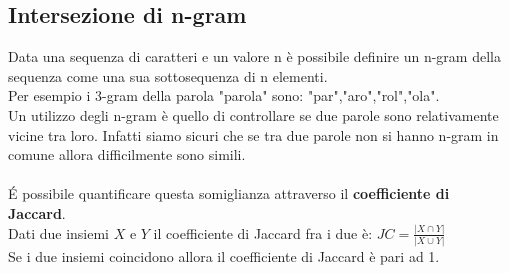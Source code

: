 \documentclass[]{article}
\begin{document}
\subsection{Intersezione di n-gram}
Data una sequenza di caratteri e un valore n è possibile definire un n-gram della sequenza come una sua sottosequenza di n elementi.\\
Per esempio i 3-gram della parola "parola" sono: "par","aro","rol","ola".\\
Un utilizzo degli n-gram è quello di controllare se due parole sono relativamente vicine tra loro. Infatti siamo sicuri che se tra due parole non si hanno n-gram in comune allora difficilmente sono simili.\\\\
\'E possibile quantificare questa somiglianza attraverso il \textbf{coefficiente di Jaccard}.\\
Dati due insiemi $X$ e $Y$ il coefficiente di Jaccard fra i due è: $JC=\frac{\lvert X\cap Y \rvert}{\lvert X\cup Y \rvert}$\\
Se i due insiemi coincidono allora il coefficiente di Jaccard è pari ad 1.
\end{document}

